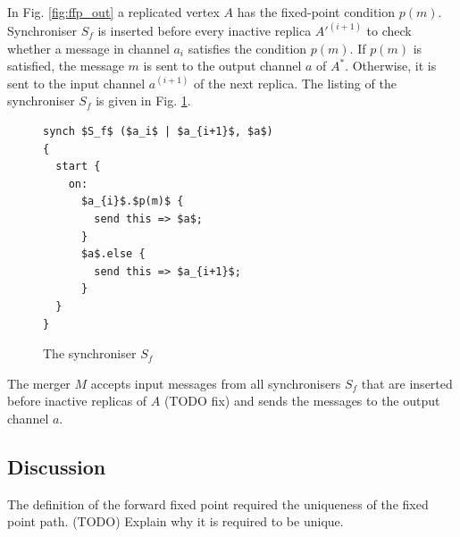 In Fig. \ref{fig:ffp_out} a replicated vertex $A$ has the fixed-point condition $p(m)$. Synchroniser $S_f$ is inserted before every inactive replica $A'^{(i+1)}$ to check whether a message in channel $a_{i}$ satisfies the condition $p(m)$. If $p(m)$ is satisfied, the message $m$ is sent to the output channel $a$ of $A^{*}$. Otherwise, it is sent to the input channel $a^{(i+1)}$ of the next replica. The listing of the synchroniser $S_f$ is given in Fig. \ref{ffp:synch_filt}.

\begin{figure}[h!]
\begin{lstlisting}[frame=single,mathescape]
synch $S_f$ ($a_i$ | $a_{i+1}$, $a$)
{
  start {
    on:
      $a_{i}$.$p(m)$ {
        send this => $a$;
      }
      $a$.else {
        send this => $a_{i+1}$;
      }
  }
}
\end{lstlisting}
\caption{The synchroniser $S_f$}
\label{ffp:synch_filt}
\end{figure}

The merger $M$ accepts input messages from all synchronisers $S_f$ that are inserted before inactive replicas of $A$ (TODO fix) and sends the messages to the output channel $a$.





    \subsection{Discussion\label{ffp_discussion}}
The definition of the forward fixed point required the uniqueness of the fixed point path. (TODO) Explain why it is required to be unique.

